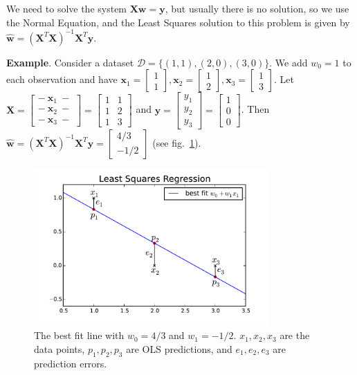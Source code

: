 \documentclass{acm_proc_article-sp}
\begin{document}
We need to solve the system \(\mathbf X \mathbf w = \mathbf y\), but usually there is no solution, so we use the Normal Equation, and the Least Squares solution to this problem is given by \(\hat {\mathbf w} = (\mathbf X^T \mathbf X)^{-1} \mathbf X^T \mathbf y\).


\textbf{Example}. Consider a dataset \(\mathcal D = \{(1,1), (2,0), (3,0) \}\). We add \(w_0 = 1\) to each observation and have \(\mathbf x_1 = \begin{bmatrix} 1 \\ 1 \end{bmatrix}, \mathbf x_2 = \begin{bmatrix} 1 \\ 2 \end{bmatrix}, \mathbf x_3 = \begin{bmatrix} 1 \\ 3 \end{bmatrix}\).
Let \(\mathbf X = \begin{bmatrix} - \ \mathbf x_1 \ - \\ - \ \mathbf x_2 \ - \\ - \ \mathbf x_3 \ - \end{bmatrix} = \begin{bmatrix} 1 & 1 \\ 1 & 2 \\ 1 & 3 \end{bmatrix}\)
and
\(\mathbf y = \begin{bmatrix} y_1 \\ y_2 \\ y_3 \end{bmatrix} = \begin{bmatrix} 1 \\ 0 \\ 0 \end{bmatrix}\). Then \(\hat {\mathbf w} = (\mathbf X^T \mathbf X)^{-1} \mathbf X^T \mathbf y = \begin{bmatrix} 4/3 \\ -1/2 \end{bmatrix}\) (see fig.~\ref{fig:ols}).


\begin{figure}%
\centering
\includegraphics[width=9cm]{ols.pdf}
\caption{The best fit line with $w_0 = 4/3$ and $w_1 = -1/2$. $x_1, x_2, x_3$ are the data points, $p_1, p_2, p_3$ are OLS predictions, and $e_1, e_2, e_3$ are prediction errors.}
\label{fig:ols}
\end{figure}
\end{document}

